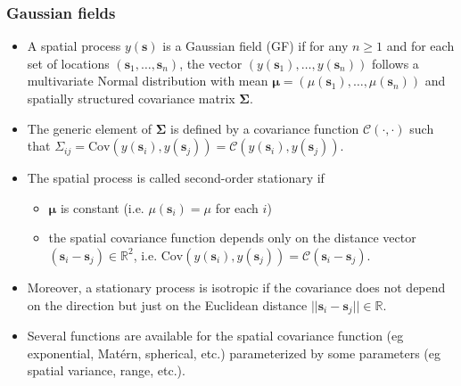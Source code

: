 \documentclass[slidestop,compress,serif,10pt]{beamer}
\begin{document}
\begin{frame}
\frametitle{Gaussian fields}
\begin{itemize}
\vfill\item A spatial process $y(\bm s)$ is a \alert{Gaussian field} (GF) if for any $n \geq 1$ and for each set of locations $(\bm s_{1},\ldots,\bm s_{n})$, the vector $\left(y(\bm s_1),\ldots, y(\bm s_n)
\right)$ follows a multivariate Normal distribution with mean $\bm \mu=\left(\mu(\bm s_{1}), \ldots, \mu(\bm s_{n})\right)$ and spatially structured covariance matrix $\bm \Sigma$. 
\vfill\item The  generic element of $\bm \Sigma$ is defined by a \alert{covariance function} $\mathcal C(\cdot,\cdot)$
 such that $\Sigma_{ij}=\mbox{Cov}\left(y(\bm s_{i}),y(\bm s_{j})\right)=\mathcal C(y(\bm s_{i}),y(\bm s_{j}))$.
\pause
\vfill\item The spatial process is called \alert{second-order stationary} if 
\begin{itemize}

\vfill\item $\bm \mu$ is constant (i.e. $\mu(\bm s_{i}) = \mu$ for each $i$) 
\vfill\item the spatial covariance function depends only on the distance vector $(\bm s_{i}-\bm s_{j}) \in \mathbb{R}^2$, i.e. $\mbox{Cov}\left(y(\bm s_{i}),y(\bm s_{j})\right)=\mathcal C(\bm s_{i}-\bm s_{j})$. 
\end{itemize}

\pause\vfill\item Moreover, a stationary process is \alert{isotropic} if the covariance does not depend on the direction but just on the Euclidean distance  $||\bm s_{i}-\bm s_{j}|| \in \mathbb{R}$.
\vfill\item[] Several functions are available for the spatial covariance function (eg exponential, Mat\'ern, spherical, etc.) parameterized by some parameters (eg spatial variance, range, etc.).
\end{itemize}
\end{frame}
\end{document}
